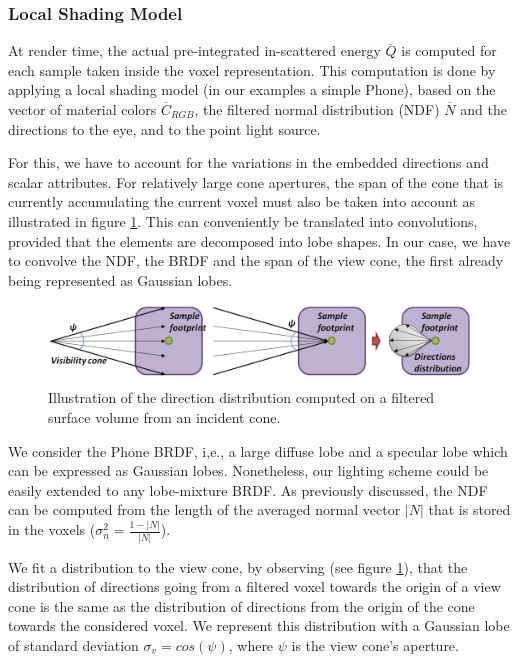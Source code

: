 \subsubsection{Local Shading Model}
At render time, the actual pre-integrated in-scattered energy $\overline{Q}$ is computed for each sample taken inside the voxel representation. This computation is done by applying a local shading model (in our examples a simple Phone), based on the vector of material colors $\overline{C}_{RGB}$, the filtered normal distribution (NDF) $\overline{N}$ and the directions to the eye, and to the point light source.

For this, we have to account for the variations in the embedded directions and scalar attributes. For relatively large cone apertures, the span of the cone that is currently accumulating the current voxel must also be taken into account as illustrated in figure \ref{f:vct-local-shading-model－1}. This can conveniently be translated into convolutions, provided that the elements are decomposed into lobe shapes. In our case, we have to convolve the NDF, the BRDF and the span of the view cone, the first already being represented as Gaussian lobes.

\begin{figure}\label{f:vct-local-shading-model－1}
	\begin{center}
		\includegraphics[width=1.\textwidth]{graphics/vct/vct-9-2}
	\end{center}
	\caption{Illustration of the direction distribution computed on a filtered surface volume from an incident cone.}
\end{figure}

We consider the Phone BRDF, i,e., a large diffuse lobe and a specular lobe which can be expressed as Gaussian lobes. Nonetheless, our lighting scheme could be easily extended to any lobe-mixture BRDF. As previously discussed, the NDF can be computed from the length of the averaged normal vector $|N|$ that is stored in the voxels ($\sigma^{2}_n=\frac{1-|N|}{|N|}$).

We fit a distribution to the view cone, by observing (see figure \ref{f:vct-local-shading-model－1}), that the distribution of directions going from a filtered voxel towards the origin of a view cone is the same as the distribution of directions from the origin of the cone towards the considered voxel. We represent this distribution with a Gaussian lobe of standard deviation $\sigma_v=cos(\psi)$, where $\psi$ is the view cone's aperture.





